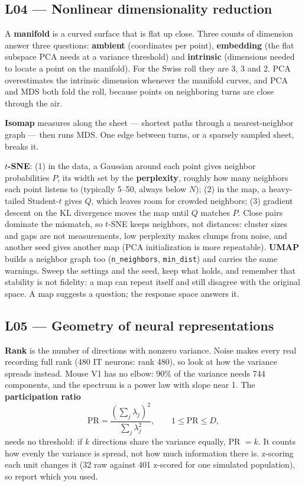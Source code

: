 \documentclass[11pt]{article}
\begin{document}
\subsection{L04 --- Nonlinear dimensionality reduction}

A \textbf{manifold} is a curved surface that is flat up close. Three counts of
dimension answer three questions: \textbf{ambient} (coordinates per point),
\textbf{embedding} (the flat subspace PCA needs at a variance threshold) and
\textbf{intrinsic} (dimensions needed to locate a point on the manifold). For
the Swiss roll they are 3, 3 and 2. PCA overestimates the intrinsic dimension
whenever the manifold curves, and PCA and MDS both fold the roll, because points
on neighboring turns are close through the air.

\textbf{Isomap} measures along the sheet --- shortest paths through a
nearest-neighbor graph --- then runs MDS. One edge between turns, or a sparsely
sampled sheet, breaks it.

\textbf{$t$-SNE}: (1) in the data, a Gaussian around each point gives neighbor
probabilities $P$, its width set by the \textbf{perplexity}, roughly how many
neighbors each point listens to (typically 5--50, always below $N$); (2) in the
map, a heavy-tailed Student-$t$ gives $Q$, which leaves room for crowded
neighbors; (3) gradient descent on the KL divergence moves the map until $Q$
matches $P$. Close pairs dominate the mismatch, so $t$-SNE keeps neighbors, not
distances: cluster sizes and gaps are not measurements, low perplexity makes
clumps from noise, and another seed gives another map (PCA initialization is
more repeatable). \textbf{UMAP} builds a neighbor graph too
(\texttt{n\_neighbors}, \texttt{min\_dist}) and carries the same warnings.
Sweep the settings and the seed, keep what holds, and remember that stability is
not fidelity: a map can repeat itself and still disagree with the original
space. A map suggests a question; the response space answers it.

\subsection{L05 --- Geometry of neural representations}

\textbf{Rank} is the number of directions with nonzero variance. Noise makes
every real recording full rank (480 IT neurons: rank 480), so look at how the
variance spreads instead. Mouse V1 has no elbow: 90\% of the variance needs 744
components, and the spectrum is a power law with slope near 1. The
\textbf{participation ratio}
\[
\mathrm{PR}=\frac{\left(\sum_j\lambda_j\right)^2}{\sum_j\lambda_j^2},\qquad 1\le \mathrm{PR}\le D,
\]
needs no threshold: if $k$ directions share the variance equally, PR $=k$. It
counts how evenly the variance is spread, not how much information there is.
z-scoring each unit changes it (32 raw against 401 z-scored for one simulated
population), so report which you used.
\end{document}
